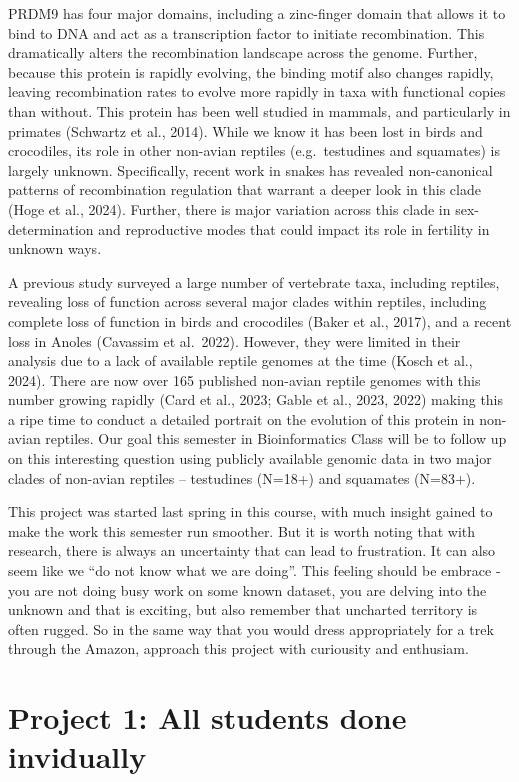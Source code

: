 \documentclass[
  letterpaper,
  DIV=11,
  numbers=noendperiod]{scrreprt}
\begin{document}
PRDM9 has four major domains, including a zinc-finger domain that allows
it to bind to DNA and act as a transcription factor to initiate
recombination. This dramatically alters the recombination landscape
across the genome. Further, because this protein is rapidly evolving,
the binding motif also changes rapidly, leaving recombination rates to
evolve more rapidly in taxa with functional copies than without. This
protein has been well studied in mammals, and particularly in primates
(Schwartz et al., 2014). While we know it has been lost in birds and
crocodiles, its role in other non-avian reptiles (e.g.~testudines and
squamates) is largely unknown. Specifically, recent work in snakes has
revealed non-canonical patterns of recombination regulation that warrant
a deeper look in this clade (Hoge et al., 2024). Further, there is major
variation across this clade in sex-determination and reproductive modes
that could impact its role in fertility in unknown ways.

A previous study surveyed a large number of vertebrate taxa, including
reptiles, revealing loss of function across several major clades within
reptiles, including complete loss of function in birds and crocodiles
(Baker et al., 2017), and a recent loss in Anoles (Cavassim et
al.~2022). However, they were limited in their analysis due to a lack of
available reptile genomes at the time (Kosch et al., 2024). There are
now over 165 published non-avian reptile genomes with this number
growing rapidly (Card et al., 2023; Gable et al., 2023, 2022) making
this a ripe time to conduct a detailed portrait on the evolution of this
protein in non-avian reptiles. Our goal this semester in Bioinformatics
Class will be to follow up on this interesting question using publicly
available genomic data in two major clades of non-avian reptiles --
testudines (N=18+) and squamates (N=83+).

This project was started last spring in this course, with much insight
gained to make the work this semester run smoother. But it is worth
noting that with research, there is always an uncertainty that can lead
to frustration. It can also seem like we ``do not know what we are
doing''. This feeling should be embrace - you are not doing busy work on
some known dataset, you are delving into the unknown and that is
exciting, but also remember that uncharted territory is often rugged. So
in the same way that you would dress appropriately for a trek through
the Amazon, approach this project with curiousity and enthusiam.

\section{Project 1: All students done
invidually}\label{project-1-all-students-done-invidually}
\end{document}
